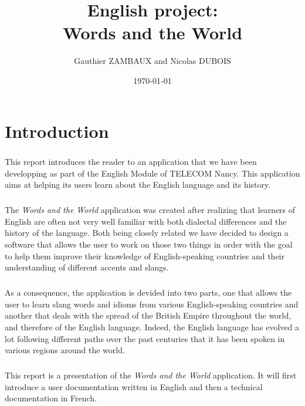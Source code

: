 \documentclass[11pt, a4paper]{report}
\title{English project:\\Words and the World}
\author{Gauthier ZAMBAUX and Nicolas DUBOIS}
\date{\today}
\begin{document}
\maketitle


\chapter*{Introduction}
\paragraph{}This report introduces the reader to an application that we have been developping as part of the English Module of TELECOM Nancy. This application aims at helping its users learn about the English language and its history.

\paragraph{}The \textit{Words and the World} application was created after realizing that learners of English are often not very well familiar with both dialectal differences and the history of the language. Both being closely related we have decided to design a software that allows the user to work on those two things in order with the goal to help them improve their knowledge of English-speaking countries and their understanding of different accents and slangs.

\paragraph{}As a consequence, the application is devided into two parts, one that allows the user to learn slang words and idioms from various English-speaking countries and another that deals with the spread of the British Empire throughout the world, and therefore of the English language. Indeed, the English language has evolved a lot following different paths over the past centuries that it has been spoken in various regions around the world.

\paragraph{}This report is a presentation of the \textit{Words and the World} application. It will first introduce a user documentation written in English and then a technical documentation in French.
\end{document}
